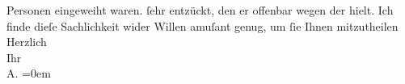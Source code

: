 \begin{ledgroupsized}[t]{13cm}
{{{                  Personen eingeweiht waren.}}}\label{K_L02975-1h} ſehr entzückt, den er offenbar wegen der \label{K_L02975-2v}\label{K_L02975-2h}{ }{\pb}hielt. \pend
           \pstart
           Ich finde dieſe Sachlichkeit wider Willen amuſant genug, um ſie Ihnen
               mitzutheilen {\\[\baselineskip]}Herzlich {\\[\baselineskip]}Ihr {\\[\baselineskip]}\spacefill\mbox{A.}\pend
           \leftskip=0em{}
         
         \endnumbering{}\end{ledgroupsized}\begin{anhang}\end{anhang}\newcommand{\dateiname}{L02975}\newcommand{\titel}{Arthur Schnitzler an Felix Salten, 14. 6. 1902}\newcommand{\editorInnen}{Martin Anton Müller und Laura Untner}
      